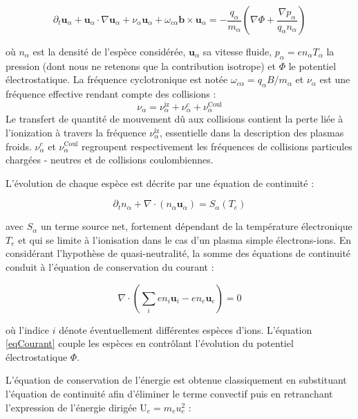 \begin{refsection}
\begin{equation}
\label{3-eqMouvement}
\partial_t \mathbf{u}_\alpha + \mathbf{u}_\alpha\cdot\nabla\mathbf{u}_\alpha+
\nu_\alpha\mathbf{u}_\alpha+\omega_{c\alpha}\mathbf{b}\times\mathbf{u}_\alpha=
-\frac{q_\alpha}{m_\alpha}\left(\nabla \Phi+\frac{\nabla
p_\alpha}{q_\alpha n_\alpha}\right)
\end{equation}

où $n_\alpha$ est la densité de l'espèce considérée, $\mathbf{u}_\alpha$ sa
vitesse fluide, $p_\alpha =en_\alpha T_\alpha$ la pression (dont nous ne
retenons que la contribution isotrope) et $\Phi$ le potentiel électrostatique. La fréquence
cyclotronique est notée $\omega_{c\alpha}=q_\alpha B/m_\alpha$ et $\nu_\alpha$
est une fréquence effective rendant compte des collisions :
\begin{equation*}
\nu_\alpha=\nu_{\alpha}^\text{iz}+\nu_{\alpha}^{c}+\nu_{\alpha}^\text{Coul}
\end{equation*}
Le transfert de quantité de mouvement dû aux collisions contient la perte liée à
l'ionization à travers la fréquence $\nu_{\alpha}^\text{iz}$, essentielle dans
la description des plasmas froids. $\nu_{\alpha}^{c}$ et
$\nu_{\alpha}^\text{Coul}$ regroupent respectivement les fréquences de
collisions particules chargées - neutres et de collisions coulombiennes.

L'évolution de chaque espèce est décrite par une équation de continuité :

\begin{equation}
\label{3-continuite}
\partial_t n_\alpha +
\nabla\cdot\left(n_\alpha\mathbf{u}_\alpha\right)=S_\alpha(T_e)
\end{equation}

avec $S_\alpha$ un terme source net, fortement dépendant de la
température électronique $T_e$ et qui se limite à l'ionisation dans le cas d'un
plasma simple électrons-ions.
En considérant l'hypothèse de quasi-neutralité, la somme des équations de
continuité conduit à l'équation de conservation du courant :

\begin{equation}
\label{eqCourant}
\nabla\cdot(\sum_ien_i\mathbf{u}_i-en_e\mathbf{u}_e)=0
\end{equation}

où l'indice $i$ dénote éventuellement différentes espèces d'ions. 
L'équation \eqref{eqCourant} couple les espèces en contrôlant
l'évolution du potentiel électrostatique $\Phi$.

L'équation de conservation de l'énergie est obtenue classiquement en substituant
l'équation de continuité afin d'éliminer le terme convectif puis en retranchant
l'expression de l'énergie dirigée $\text{U}_e=m_eu_e^2$ :


\end{refsection}
